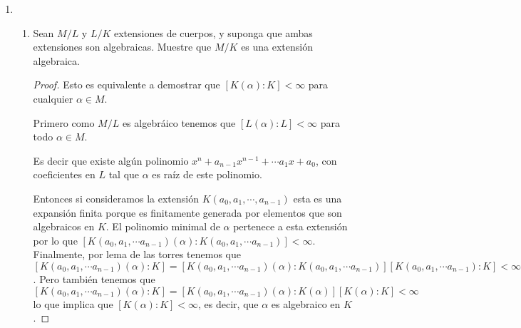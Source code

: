\documentclass[letter,twoside,12pt]{article}
\begin{document}
\begin{enumerate}
\begin{enumerate}
\begin{proof}
Tenemos que el homomorfismo $ \phi:K[x] \to K[\alpha] $ donde $ \phi $ es evaluación por $ \alpha $ es un homomorfismo sobreyectivo. Lo único que resta es demostrar que este homomorfismo es inyectivo si y solo sí $ \alpha $ es trascendente.

De hecho sabemos que $ \alpha $ es trascendente si y solo sí $ \alpha $ no es algebraico, es decir, si y solo si no existe un polinomio $ P(x) $ distinto al polinomio 0 tal que $ P(x)=0 $. Pero esto es equivalente a que el kernel de $ \phi $ es igual a $ \{0\} $, lo que significa que el homomorfismo es además inyectivo y por lo tanto es un isomorfismo. 
\end{proof}

\end{enumerate}

\item \begin{enumerate}
\item Sean $ M/L $ y $ L/K $ extensiones de cuerpos, y suponga que ambas extensiones son algebraicas. Muestre
que $ M/K $ es una extensión algebraica.

\begin{proof}

Esto es equivalente a demostrar que $ [K(\alpha):K]< \infty $ para cualquier $ \alpha \in M $.

Primero como $ M/L $ es algebráico tenemos que $ [L(\alpha):L]< \infty $ para todo $ \alpha \in M $.

Es decir que existe algún polinomio $ x^n+a_{n-1}x^{n-1}+ \cdots a_1x+a_0 $, con coeficientes en $ L $ tal que $ \alpha $ es raíz de este polinomio.

Entonces si consideramos la extensión $ K(a_0,a_1,\cdots, a_{n-1}) $ esta es una expansión finita porque es finitamente generada por elementos que son algebraicos en $ K $. El polinomio minimal de $ \alpha $ pertenece a esta extensión por lo que $ [K(a_0,a_1,\cdots a_{n-1})(\alpha):K(a_0,a_1,\cdots a_{n-1})] < \infty $. 
Finalmente, por lema de las torres tenemos que $ [K(a_0,a_1,\cdots a_{n-1})(\alpha):K]=[K(a_0,a_1,\cdots a_{n-1})(\alpha):K(a_0,a_1,\cdots a_{n-1})][K(a_0,a_1,\cdots a_{n-1}):K] < \infty $.
Pero también tenemos que $ [K(a_0,a_1,\cdots a_{n-1})(\alpha):K]=[K(a_0,a_1,\cdots a_{n-1})(\alpha):K(\alpha)][K(\alpha):K] < \infty $ lo que implica que $ [K(\alpha):K] < \infty $, es decir, que $ \alpha $ es algebraico en $ K $. 
\end{proof}


\end{enumerate}
\end{enumerate}
\end{document}
